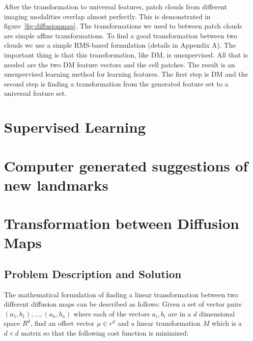 \documentclass[runningheads]{llncs}
\begin{document}
\begin{enumerate}
After the transformation to universal features, patch clouds from
different imaging modalities overlap almost perfectly. This is
demonstrated in figure~\ref{fig:diffusionmap}. 
The transformations we used to between patch clouds are simple affine
transformations. To find a good transformation between two clouds we
use a simple RMS-based formulation (details in Appendix A). The
important thing is that this transformation, like DM, is
unsupervised. All that is needed are the two DM feature vectors and
the cell patches. The result is an unsupervised learning method for
learning features. The first step is DM and the second step is finding
a transformation from the generated feature set to a universal feature
set.

\section{Supervised Learning}

\section{Computer generated suggestions of new landmarks}

 
 

\appendix


\section{Transformation between Diffusion Maps}
\subsection{Problem Description and Solution}
The mathematical formulation of finding a linear transformation between two different diffusion maps can be described as follows: Given a set of vector pairs $(a_1,b_1),\ldots,(a_n,b_n)$ where each of the vectors $a_i,b_i$ are in a $d$ dimensional space $R^d$,  find an offset vector $\mu \in r^d$ and a linear transformation $M$ which is a $d \times d$ matrix so that the following cost function is minimized:


\end{enumerate}
\end{document}
